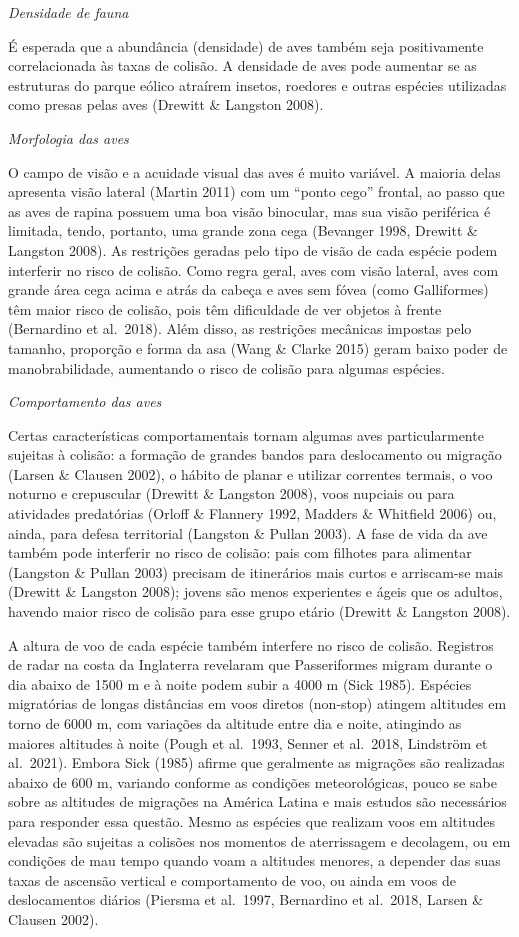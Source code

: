 \documentclass[
  oneside]{scrbook}
\begin{document}
\emph{Densidade de fauna}

É esperada que a abundância (densidade) de aves também seja positivamente correlacionada às taxas de colisão. A densidade de aves pode aumentar se as estruturas do parque eólico atraírem insetos, roedores e outras espécies utilizadas como presas pelas aves (Drewitt \& Langston 2008).

\emph{Morfologia das aves}

O campo de visão e a acuidade visual das aves é muito variável. A maioria delas apresenta visão lateral (Martin 2011) com um ``ponto cego'' frontal, ao passo que as aves de rapina possuem uma boa visão binocular, mas sua visão periférica é limitada, tendo, portanto, uma grande zona cega (Bevanger 1998, Drewitt \& Langston 2008). As restrições geradas pelo tipo de visão de cada espécie podem interferir no risco de colisão. Como regra geral, aves com visão lateral, aves com grande área cega acima e atrás da cabeça e aves sem fóvea (como Galliformes) têm maior risco de colisão, pois têm dificuldade de ver objetos à frente (Bernardino et al.~2018). Além disso, as restrições mecânicas impostas pelo tamanho, proporção e forma da asa (Wang \& Clarke 2015) geram baixo poder de manobrabilidade, aumentando o risco de colisão para algumas espécies.

\emph{Comportamento das aves}

Certas características comportamentais tornam algumas aves particularmente sujeitas à colisão: a formação de grandes bandos para deslocamento ou migração (Larsen \& Clausen 2002), o hábito de planar e utilizar correntes termais, o voo noturno e crepuscular (Drewitt \& Langston 2008), voos nupciais ou para atividades predatórias (Orloff \& Flannery 1992, Madders \& Whitfield 2006) ou, ainda, para defesa territorial (Langston \& Pullan 2003). A fase de vida da ave também pode interferir no risco de colisão: pais com filhotes para alimentar (Langston \& Pullan 2003) precisam de itinerários mais curtos e arriscam-se mais (Drewitt \& Langston 2008); jovens são menos experientes e ágeis que os adultos, havendo maior risco de colisão para esse grupo etário (Drewitt \& Langston 2008).

A altura de voo de cada espécie também interfere no risco de colisão. Registros de radar na costa da Inglaterra revelaram que Passeriformes migram durante o dia abaixo de 1500 m e à noite podem subir a 4000 m (Sick 1985). Espécies migratórias de longas distâncias em voos diretos (non-stop) atingem altitudes em torno de 6000 m, com variações da altitude entre dia e noite, atingindo as maiores altitudes à noite (Pough et al.~1993, Senner et al.~2018, Lindström et al.~2021). Embora Sick (1985) afirme que geralmente as migrações são realizadas abaixo de 600 m, variando conforme as condições meteorológicas, pouco se sabe sobre as altitudes de migrações na América Latina e mais estudos são necessários para responder essa questão. Mesmo as espécies que realizam voos em altitudes elevadas são sujeitas a colisões nos momentos de aterrissagem e decolagem, ou em condições de mau tempo quando voam a altitudes menores, a depender das suas taxas de ascensão vertical e comportamento de voo, ou ainda em voos de deslocamentos diários (Piersma et al.~1997, Bernardino et al.~2018, Larsen \& Clausen 2002).
\end{document}
